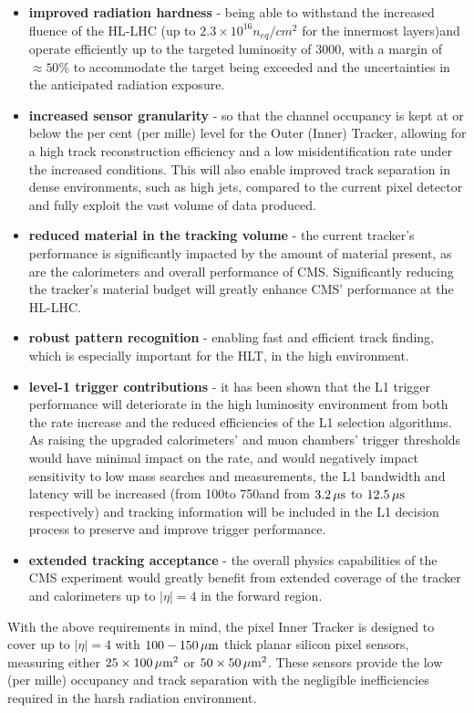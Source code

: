 \begin{itemize}
\item \textbf{improved radiation hardness} - being able to withstand the increased fluence of the HL-LHC (up to $2.3\times10^{16} n_{eq}/cm^{2}$ for the innermost layers)and operate efficiently up to the targeted luminosity of 3000\fbinv, with a margin of $\approx50\%$ to accommodate the target being exceeded and the uncertainties in the anticipated radiation exposure.
\item \textbf{increased sensor granularity} - so that the channel occupancy is kept at or below the per cent (per mille) level for the Outer (Inner) Tracker, allowing for a high track reconstruction efficiency and a low misidentification rate under the increased \PU conditions. This will also enable improved track separation in dense environments, such as high \pT jets, compared to the current pixel detector and fully exploit the vast volume of data produced.
\item \textbf{reduced material in the tracking volume} - the current tracker's performance is significantly impacted by the amount of material present, as are the calorimeters and overall performance of CMS.
Significantly reducing the tracker's material budget will greatly enhance CMS' performance at the HL-LHC.
\item \textbf{robust pattern recognition} - enabling fast and efficient track finding, which is especially important for the HLT, in the high \PU environment.
\item \textbf{level-1 trigger contributions} - it has been shown that the L1 trigger performance will deteriorate in the high luminosity environment from both the rate increase and the reduced efficiencies of the L1 selection algorithms.
As raising the upgraded calorimeters' and muon chambers' trigger thresholds would have minimal impact on the rate, and would negatively impact sensitivity to low mass searches and measurements, the L1 bandwidth and latency will be increased (from 100\kHz to 750\kHz and from $3.2\,\mu\text{s}$ to $12.5\,\mu\text{s}$ respectively) and tracking information will be included in the L1 decision process to preserve and improve trigger performance.
\item \textbf{extended tracking acceptance} - the overall physics capabilities of the CMS experiment would greatly benefit from extended coverage of the tracker and calorimeters up to $|\eta| = 4$ in the forward region.
\end{itemize}

With the above requirements in mind, the pixel Inner Tracker is designed to cover up to $|\eta| = 4$ with $100-150\,\mu\text{m}$ thick planar silicon pixel sensors, measuring either $25\times100\,\mu\text{m}^{2}$ or $50\times50\,\mu\text{m}^{2}$.
These sensors provide the low (per mille) occupancy and track separation with the negligible inefficiencies required in the harsh radiation environment.

